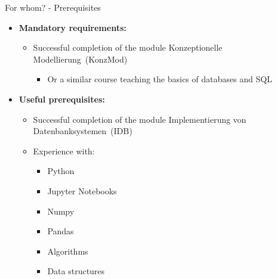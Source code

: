 \begin{frame}{For whom? - Prerequisites}
	\begin{itemize}
		\item \textbf{Mandatory requirements:}
		      \begin{itemize}
			      \item Successful completion of the module \glqq Konzeptionelle Modellierung\grqq~(KonzMod)
			            \begin{itemize}
				            \item Or a similar course teaching the basics of databases and SQL
			            \end{itemize}
		      \end{itemize}
		\item \textbf{Useful prerequisites:}
		      \begin{itemize}
			      \item Successful completion of the module \glqq Implementierung von Datenbanksystemen\grqq~(IDB)
			      \item Experience with:
			            \begin{itemize}
				            \item Python
				            \item Jupyter Notebooks
				            \item Numpy
				            \item Pandas
				            \item Algorithms
				            \item Data structures
			            \end{itemize}
		      \end{itemize}
	\end{itemize}

\end{frame}


